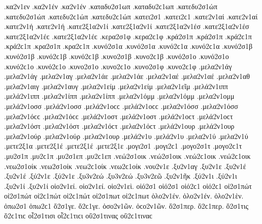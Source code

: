 {.κα2ν1εν 
.κα2ν1έν .κα2ν1έν 
.καταδυ2σ1ωπ .καταδυ2ϲ1ωπ   %
.κατεδυ2σ1ώπ .κατεδυ2σ1ώπ .κατεδυ2ϲ1ώπ .κατεδυ2ϲ1ώπ   %
.κατει2σ1 .κατει2ϲ1   %
.κατε2ν1αί .κατε2ν1αί   %
.κατε2ν1ή .κατε2ν1ή   %
.κατε2ξ1α2ν1ί .κατε2ξ1α2ν1ί   %
.κατε2ξ1α2ν1έσ .κατε2ξ1α2ν1έσ .κατε2ξ1α2ν1έϲ .κατε2ξ1α2ν1έϲ   %
.κερα2σ1φ .κερα2ϲ1φ   %
.κρά2σ1π .κρά2σ1π .κρά2ϲ1π .κρά2ϲ1π   %
.κρα2σ1π .κρα2ϲ1π 
.κυνό2σ1α .κυνό2σ1α .κυνό2ϲ1α .κυνό2ϲ1α   %
.κυνό2σ1β .κυνό2σ1β .κυνό2ϲ1β .κυνό2ϲ1β   %
.κυνο2σ1β .κυνο2ϲ1β 
.κυνό2σ1ο .κυνό2σ1ο .κυνό2ϲ1ο .κυνό2ϲ1ο   %
.κυνο2σ1ο .κυνο2ϲ1ο 
.κυνο2σ1φ .κυνο2ϲ1φ   %
.μελα2ν1άγ .μελα2ν1άγ   %
.μελα2ν1αγ 
.μελα2ν1άε .μελα2ν1άε   %
.μελα2ν1αέ .μελα2ν1αέ 
.μελα2ν1αθ   %
.μελα2ν1αιγ   %
.μελα2ν1αυγ   %
.μελα2ν1είμ .μελα2ν1είμ   %
.μελα2ν1εῖμ   %
.μελά2ν1ιππ .μελά2ν1ιππ   %
.μελα2ν1ίππ .μελα2ν1ίππ 
.μελα2ν1όμμ .μελα2ν1όμμ   %
.μελα2ν1ομμ 
.μελά2ν1οσσ .μελά2ν1οσσ .μελά2ν1οϲϲ .μελά2ν1οϲϲ   %
.μελα2ν1όσσ .μελα2ν1όσσ .μελα2ν1όϲϲ .μελα2ν1όϲϲ 
.μελά2ν1οστ .μελά2ν1οστ .μελά2ν1οϲτ .μελά2ν1οϲτ   %
.μελα2ν1όστ .μελα2ν1όστ .μελα2ν1όϲτ .μελα2ν1όϲτ 
.μελά2ν1ουρ .μελά2ν1ουρ   %
.μελα2ν1ούρ .μελα2ν1ούρ 
.μελα2ν1ουρ   %
.μελά2ν1υ .μελά2ν1υ   %
.μελα2ν1ύ .μελα2ν1ύ 
.μετε2ξ1α   %
.μετε2ξ1έ .μετε2ξ1έ   %
.μετε2ξ1ε 
.μογι2σ1 .μογι2ϲ1   %
.μογο2σ1τ .μογο2ϲ1τ   %
.μυ2σ1π .μυ2ϲ1π   %
.μυ2σ1επ .μυ2ϲ1επ   %
.νεώ2σ1οικ .νεώ2σ1οικ .νεώ2ϲ1οικ .νεώ2ϲ1οικ   %
.νεω2σ1οίκ .νεω2σ1οίκ .νεω2ϲ1οίκ .νεω2ϲ1οίκ 
.νου2ν1ε   %
.ξυ2ν1αγ   %
.ξυ2ν1ε 
.ξυ2ν1έ .ξυ2ν1έ 
.ξύ2ν1ε .ξύ2ν1ε 
.ξυ3ν2εώ .ξυ3ν2εώ   %
.ξυ3ν2εῶ 
.ξυ2ν1ῆκ   %
.ξύ2ν1ι .ξύ2ν1ι   %
.ξυ2ν1ί .ξυ2ν1ί   %
οἱο2ν1εί. οἱο2ν1εί.   %
οἱο2ν1εὶ. 
οἱό2σ1 οἱό2σ1 οἱό2ϲ1 οἱό2ϲ1   %
οἰ2σ1πώτ οἰ2σ1πώτ οἰ2ϲ1πώτ οἰ2ϲ1πώτ   %
οἰ2σ1πωτ οἰ2ϲ1πωτ 
ὁλο2ν1έν. ὁλο2ν1έν. 
ὁλο2ν1ὲν. 
ὁπω2σ1 ὁπω2ϲ1   %
ὅ2σ1γε. ὅ2ϲ1γε.   %
ὁσο2ν1ῶν. ὁϲο2ν1ῶν.   %
ὅ2σ1περ. ὅ2ϲ1περ.   %
ὅ2σ1τις ὅ2ϲ1τιϲ   %
οἷ2σ1τισι οἷ2ϲ1τιϲι   %
οὕ2σ1τινας οὕ2ϲ1τιναϲ   %
}
